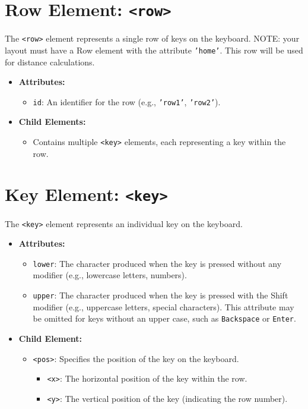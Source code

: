 \documentclass{article}
\begin{document}
\section{Row Element: \texttt{<row>}}
The \texttt{<row>} element represents a single row of keys on the keyboard.
NOTE: your layout must have a Row element with the attribute \texttt{'home'}.
This row will be used for distance calculations.

\begin{itemize}
    \item \textbf{Attributes:}
    \begin{itemize}
        \item \texttt{id}: An identifier for the row (e.g., \texttt{'row1'}, \texttt{'row2'}).
    \end{itemize}
    \item \textbf{Child Elements:}
    \begin{itemize}
        \item Contains multiple \texttt{<key>} elements, each representing a key within the row.
    \end{itemize}
\end{itemize}

\section{Key Element: \texttt{<key>}}
The \texttt{<key>} element represents an individual key on the keyboard.

\begin{itemize}
    \item \textbf{Attributes:}
    \begin{itemize}
        \item \texttt{lower}: The character produced when the key is pressed without any modifier (e.g., lowercase letters, numbers).
        \item \texttt{upper}: The character produced when the key is pressed with the Shift modifier (e.g., uppercase letters, special characters). This attribute may be omitted for keys without an upper case, such as \texttt{Backspace} or \texttt{Enter}.
    \end{itemize}
    \item \textbf{Child Element:}
    \begin{itemize}
        \item \texttt{<pos>}: Specifies the position of the key on the keyboard.
        \begin{itemize}
            \item \texttt{<x>}: The horizontal position of the key within the row.
            \item \texttt{<y>}: The vertical position of the key (indicating the row number).
        \end{itemize}
    \end{itemize}
\end{itemize}
\end{document}
